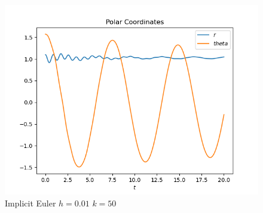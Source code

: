 \documentclass{scrartcl}
\begin{document}
\begin{figure}[h]
\centering
\begin{minipage}[b]{0.45\textwidth}
\centering
\includegraphics[width=\textwidth]{../Plots/ImpEuler/imp_euler_h=0.01_k=50_c}
\caption{Implicit Euler $h=0.01$ $k=50$}
\label{imp_euler_h=0.01_k=50_c}
\end{minipage}
\end{figure}
\end{document}
